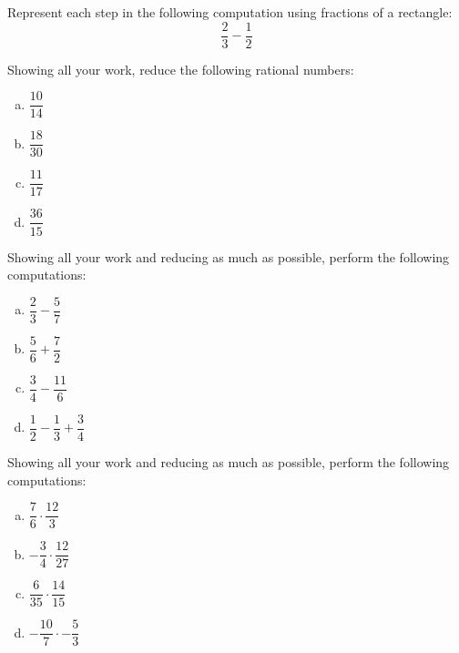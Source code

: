\documentclass[11pt,letterpaper]{article}
\begin{document}

 Represent each step in the following computation using fractions of a rectangle:
	\[
	\dfrac{2}{3} - \dfrac{1}{2}
	\]



\newpage



 Showing all your work, reduce the following rational numbers:
	\begin{enumerate}[(a)]
	\item $\dfrac{10}{14}$
	\item $\dfrac{18}{30}$
	\item $\dfrac{11}{17}$
	\item $\dfrac{36}{15}$
	\end{enumerate}



\newpage



 Showing all your work and reducing as much as possible, perform the following computations: 
	\begin{enumerate}[(a)]
	\item $\dfrac{2}{3} - \dfrac{5}{7}$
	\item $\dfrac{5}{6} + \dfrac{7}{2}$
	\item $\dfrac{3}{4} - \dfrac{11}{6}$
	\item $\dfrac{1}{2} - \dfrac{1}{3} + \dfrac{3}{4}$
	\end{enumerate}



\newpage



 Showing all your work and reducing as much as possible, perform the following computations: 
	\begin{enumerate}[(a)]
	\item $\dfrac{7}{6} \cdot \dfrac{12}{3}$
	\item $-\dfrac{3}{4} \cdot \dfrac{12}{27}$
	\item $\dfrac{6}{35} \cdot \dfrac{14}{15}$
	\item $-\dfrac{10}{7} \cdot - \dfrac{5}{3}$
	\end{enumerate}



\newpage
\end{document}
